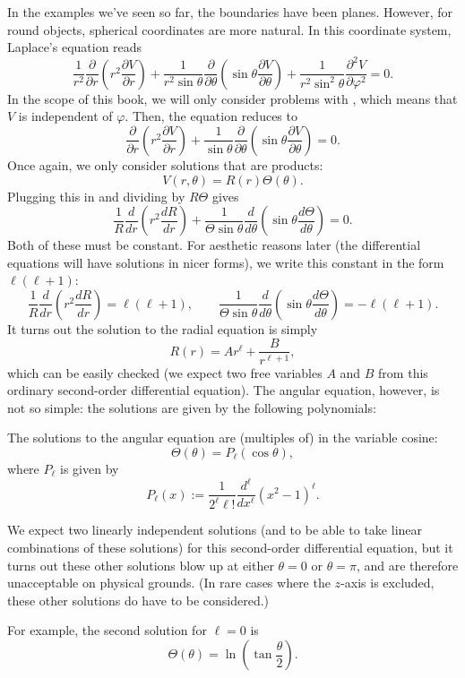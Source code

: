 In the examples we've seen so far, the boundaries have been planes. However, for round objects, spherical coordinates are more natural. In this coordinate system, Laplace's equation reads
\[\frac{1}{r^2}\frac{\partial}{\partial r}\left(r^2\frac{\partial V}{\partial r}\right)+\frac{1}{r^2\sin\theta}\frac{\partial}{\partial\theta}\left(\sin\theta\frac{\partial V}{\partial\theta}\right)
+\frac{1}{r^2\sin^2\theta}\frac{\partial^2V}{\partial \varphi^2}=0.\]
In the scope of this book, we will only consider problems with , which means that $V$ is independent of $\varphi$. Then, the equation reduces to
\[\frac{\partial}{\partial r}\left(r^2\frac{\partial V}{\partial r}\right)+\frac{1}{\sin\theta}\frac{\partial}{\partial \theta}\left(\sin\theta\frac{\partial V}{\partial \theta}\right)=0.\]
Once again, we only consider solutions that are products:
\[V(r,\theta)=R(r)\Theta(\theta).\]
Plugging this in and dividing by $R\Theta$ gives
\[\frac{1}{R}\frac{d}{dr}\left(r^2\frac{dR}{dr}\right)+\frac{1}{\Theta\sin\theta}\frac{d}{d\theta}\left(\sin\theta\frac{d\Theta}{d\theta}\right)=0.\]
Both of these must be constant. For aesthetic reasons later (the differential equations will have solutions in nicer forms), we write this constant in the form $\ell(\ell+1)$:
\[\frac{1}{R}\frac{d}{dr}\left(r^2\frac{dR}{dr}\right)=\ell(\ell+1), \qquad \frac{1}{\Theta\sin\theta}\frac{d}{d\theta}\left(\sin\theta\frac{d\Theta}{d\theta}\right)=-\ell(\ell+1).\]
It turns out the solution to the radial equation is simply
\[R(r)=Ar^\ell+\frac{B}{r^{\ell+1}},\]
which can be easily checked (we expect two free variables $A$ and $B$ from this ordinary second-order differential equation). The angular equation, however, is not so simple: the solutions are given by the following polynomials:
\begin{definition}
The solutions to the angular equation are (multiples of)  in the variable cosine:
\[\Theta(\theta)=P_\ell(\cos\theta),\]
where $P_\ell$ is given by 
\[P_\ell(x):=\frac{1}{2^\ell \ell!}\frac{d^\ell}{dx^\ell}(x^2-1)^\ell.\]
\end{definition}
\begin{remark}
We expect two linearly independent solutions (and to be able to take linear combinations of these solutions) for this second-order differential equation, but it turns out these other solutions blow up at either $\theta=0$ or $\theta=\pi$, and are therefore unacceptable on physical grounds. (In rare cases where the $z$-axis is excluded, these other solutions do have to be considered.)

For example, the second solution for $\ell=0$ is
\[\Theta(\theta)=\ln\left(\tan\frac{\theta}{2}\right).\]
\end{remark}


